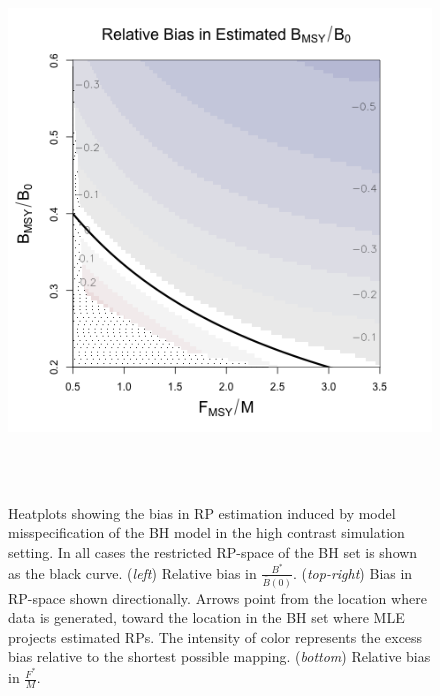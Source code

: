 %
\begin{figure}[h!]
\begin{minipage}[h!]{0.46\textwidth}
\hspace*{-0.5cm}
\includegraphics[width=1.175\textwidth]{../gpBias/zetaRelBiasSchnuteExpT45N150Wide.png}\\
\hspace*{1cm}
\vspace{-1cm}
\caption{\label{contrastTrio}
Heatplots showing the bias in RP estimation induced by model misspecification of
the BH model in the high contrast simulation setting.
In all cases the restricted RP-space of the BH set is shown as the black curve.
(\emph{left}) Relative bias in $\frac{B^*}{\bar B(0)}$.  (\emph{top-right})
Bias in RP-space shown directionally. Arrows point from the location where
data is generated, toward the location in the BH set where MLE projects estimated
RPs. The intensity of color represents the excess bias relative
to the shortest possible mapping. (\emph{bottom}) Relative bias in $\frac{F^*}{M}$.
}
$~$\\$~$\\
\end{minipage}
\begin{minipage}[h!]{0.44\textwidth}
\vspace{-0.8cm}
\hspace*{-0.1cm}

\end{minipage}
\end{figure}
